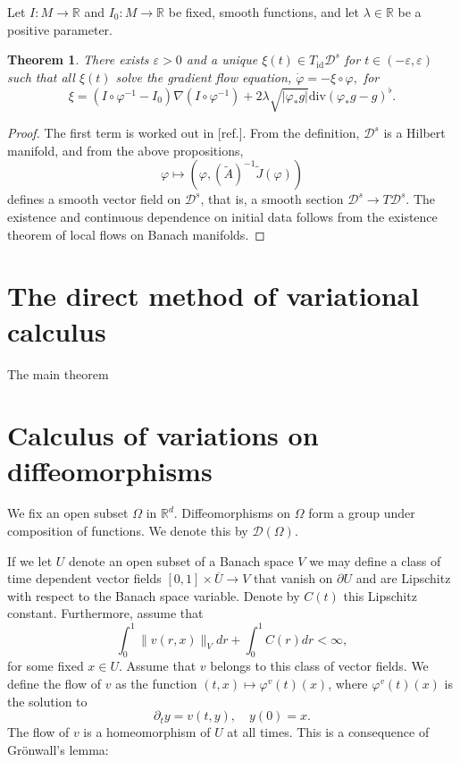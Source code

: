\documentclass[a5paper,10pt,twoside]{article}
\newcommand{\R}{\ensuremath{\mathbb{R}}}
\newcommand{\cD}{\ensuremath{\mathcal{D}}}
\DeclareMathOperator*{\id}{id}
\theoremstyle{plain}
\newtheorem{teo}{Theorem}[section]
\theoremstyle{definition}
\theoremstyle{remark}
\begin{document}
Let $I:M\to\R$ and $I_0:M\to\R$ be fixed, smooth functions, and let $\lambda\in\R$ be a positive parameter.

\begin{teo}
There exists $\varepsilon>0$ and a unique $\xi(t)\in T_{\id}\cD^s$ for $t\in(-\varepsilon,\varepsilon)$ such that all $\xi(t)$ solve the gradient flow equation, $\dot{\varphi}=-\xi\circ\varphi,$ for
$$
\xi = (I\circ\varphi^{-1}-I_0)\nabla(I\circ\varphi^{-1}) + 2\lambda\sqrt{|\varphi_*g|}\mathrm{div}(\varphi_*g-g)^\flat.
$$
\end{teo}

\begin{proof}
The first term is worked out in [ref.]. From the definition, $\cD^s$ is a Hilbert manifold, and from the above propositions,
%
\begin{equation}
  \varphi\mapsto \left(\varphi,(\tilde{A})^{-1}\tilde{J}(\varphi)\right) 
\end{equation} 
%
defines a smooth vector field on $\cD^s$, that is, a smooth section $\cD^s\to T\cD^s$. The existence and continuous dependence on initial data follows from the existence theorem of local flows on Banach manifolds.
\end{proof}





\newpage
\appendix
\section{The direct method of variational calculus}
The main theorem

\section[Calculus of variations]{Calculus of variations on diffeomorphisms}
We fix an open subset $\Omega$ in $\R^d$. Diffeomorphisms on $\Omega$ form a group under composition of functions. We denote this by $\cD(\Omega)$.

If we let $U$ denote an open subset of a Banach space $V$ we may define a class of time dependent vector fields $[0,1]\times \overline{U}\to V$ that vanish on $\partial U$ and are Lipschitz with respect to the Banach space variable. Denote by $C(t)$ this Lipschitz constant. Furthermore, assume that
\[
\int_0^1\|v(r,x)\|_Vdr+\int_0^1 C(r)dr<\infty,
\]
for some fixed $x\in U$. Assume that $v$ belongs to this class of vector fields. We define the flow of $v$ as the function $(t,x)\mapsto\varphi^v(t)(x)$, where $\varphi^v(t)(x)$ is the solution to 
\[ \partial_t y=v(t,y),\quad y(0)=x. \]
The flow of $v$ is a homeomorphism of $U$ at all times. This is a consequence of Grönwall's lemma:
\end{document}
